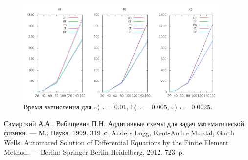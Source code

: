 \documentclass[12pt]{article}
\begin{document}
\begin{figure}
	\begin{center}
		\includegraphics[width=400px]{data160/scheme-time}
		\caption{Время вычисления для a) $\tau=0.01$, b) $\tau=0.005$, c) $\tau=0.0025$.}
		\label{fg:scheme-time}
	\end{center}
\end{figure}

\begin{thebibliography}{9}
 Самарский А.А., Вабищевич П.Н. Аддитивные схемы для задач математической физики. \newblock --- М.: Наука, 1999. 319~с.
 Anders Logg, Kent-Andre Mardal, Garth Wells. Automated Solution of Differential Equations by the Finite Element Method. \newblock --- Berlin: Springer Berlin Heidelberg, 2012. 723~p.
\end{thebibliography}
\end{document}

